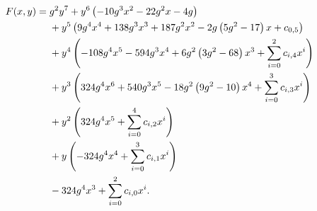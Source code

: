 \begin{align}
    \label{curve:cubic_three}
    F(x,y)={} & g^2y^{7}{}+y^{6}\left(-10 g^3x^{2} - 22 g^2x - 4 g\right)\notag \\
              & {}+y^{5}\left(9 g^4x^{4} + 138 g^3x^{3} + 187 g^2x^{2} - 2 g \left(5 g^2-17\right)x + c_{0,5}\right)\notag \\
              & {}+y^{4}\left(-108 g^4x^{5} - 594 g^3x^{4} + 6 g^2 \left(3 g^2-68\right)x^{3} + \sum_{i=0}^{2}c_{i,4}x^i\right)\notag \\
              & {}+y^{3}\left(324 g^4x^{6} + 540 g^3x^{5} - 18 g^2 \left(9 g^2-10\right)x^{4} + \sum_{i=0}^{3}c_{i,3}x^i\right)\notag \\
              & {}+y^{2}\left(324 g^4x^{5} + \sum_{i=0}^{4}c_{i,2}x^i\right)\notag \\
              & {}+y\left(-324 g^4x^{4} + \sum_{i=0}^{3}c_{i,1}x^i\right)\notag \\
              & {}-324 g^4x^{3} + \sum_{i=0}^{2}c_{i,0}x^i.
\end{align}
